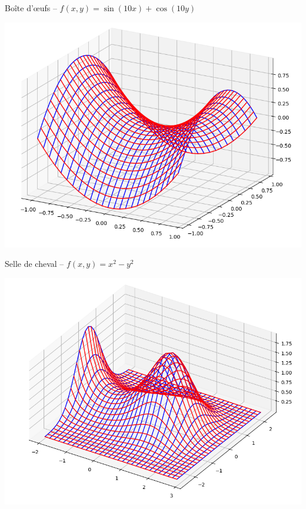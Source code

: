 \documentclass[11pt,class=report,crop=false]{standalone}
\begin{document}
\begin{activite}[Surfaces]
\begin{enumerate}
\begin{center}
\begin{minipage}{0.3\textwidth}
\begin{center}
			Boîte d'\oe ufs -- $f(x,y) = \sin(10x)+\cos(10y)$
		\end{center}
	\end{minipage}\quad
	\begin{minipage}{0.3\textwidth}
		\begin{center}
			\includegraphics[scale=\myscale,scale=0.2]{ecran-surface-4}
			
			Selle de cheval -- $f(x,y) = x^2-y^2$
		\end{center}
	\end{minipage}
	\begin{minipage}{0.3\textwidth}
		\begin{center}
			\includegraphics[scale=\myscale,scale=0.2]{ecran-surface-5}
			

\end{center}
\end{minipage}
\end{center}
\end{enumerate}
\end{activite}
\end{document}
